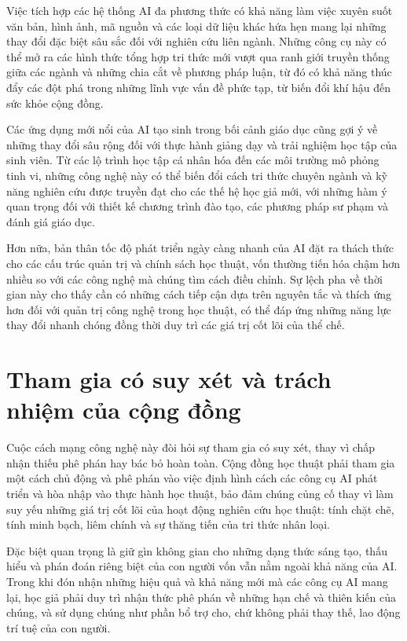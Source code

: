 Việc tích hợp các hệ thống AI đa phương thức có khả năng làm việc xuyên suốt văn bản, hình ảnh, mã nguồn và các loại dữ liệu khác hứa hẹn mang lại những thay đổi đặc biệt sâu sắc đối với nghiên cứu liên ngành. Những công cụ này có thể mở ra các hình thức tổng hợp tri thức mới vượt qua ranh giới truyền thống giữa các ngành và những chia cắt về phương pháp luận, từ đó có khả năng thúc đẩy các đột phá trong những lĩnh vực vấn đề phức tạp, từ biến đổi khí hậu đến sức khỏe cộng đồng.

Các ứng dụng mới nổi của AI tạo sinh trong bối cảnh giáo dục cũng gợi ý về những thay đổi sâu rộng đối với thực hành giảng dạy và trải nghiệm học tập của sinh viên. Từ các lộ trình học tập cá nhân hóa đến các môi trường mô phỏng tinh vi, những công nghệ này có thể biến đổi cách tri thức chuyên ngành và kỹ năng nghiên cứu được truyền đạt cho các thế hệ học giả mới, với những hàm ý quan trọng đối với thiết kế chương trình đào tạo, các phương pháp sư phạm và đánh giá giáo dục.

Hơn nữa, bản thân tốc độ phát triển ngày càng nhanh của AI đặt ra thách thức cho các cấu trúc quản trị và chính sách học thuật, vốn thường tiến hóa chậm hơn nhiều so với các công nghệ mà chúng tìm cách điều chỉnh. Sự lệch pha về thời gian này cho thấy cần có những cách tiếp cận dựa trên nguyên tắc và thích ứng hơn đối với quản trị công nghệ trong học thuật, có thể đáp ứng những năng lực thay đổi nhanh chóng đồng thời duy trì các giá trị cốt lõi của thể chế.

\section{Tham gia có suy xét và trách nhiệm của cộng đồng}

Cuộc cách mạng công nghệ này đòi hỏi sự tham gia có suy xét, thay vì chấp nhận thiếu phê phán hay bác bỏ hoàn toàn. Cộng đồng học thuật phải tham gia một cách chủ động và phê phán vào việc định hình cách các công cụ AI phát triển và hòa nhập vào thực hành học thuật, bảo đảm chúng củng cố thay vì làm suy yếu những giá trị cốt lõi của hoạt động nghiên cứu học thuật: tính chặt chẽ, tính minh bạch, liêm chính và sự thăng tiến của tri thức nhân loại.

Đặc biệt quan trọng là giữ gìn không gian cho những dạng thức sáng tạo, thấu hiểu và phán đoán riêng biệt của con người vốn vẫn nằm ngoài khả năng của AI. Trong khi đón nhận những hiệu quả và khả năng mới mà các công cụ AI mang lại, học giả phải duy trì nhận thức phê phán về những hạn chế và thiên kiến của chúng, và sử dụng chúng như phần bổ trợ cho, chứ không phải thay thế, lao động trí tuệ của con người.

